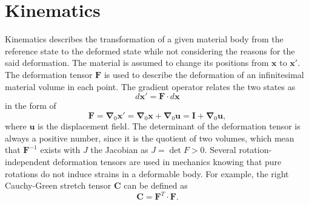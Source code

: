 \appendix
\chapter{Kinematics}\label{app-kine}
Kinematics describes the transformation of a given material body from the reference state to the deformed state while not considering the reasons for the said deformation. The material is assumed to change its positions from $ \textbf{x} $ to $ \textbf{x}' $. The deformation tensor $ \textbf{F} $ is used to describe the deformation of an infinitesimal material volume in each point. The gradient operator relates the two states as
\begin{equation}\label{app-kine-1-1}
d\textbf{x}'=\textbf{F}\cdot d\textbf{x}
\end{equation}
in the form of 
\begin{equation}\label{app-kine-1-2}
\textbf{F}=\bm\nabla_0\textbf{x}'=\bm\nabla_0\textbf{x}+\bm\nabla_0\textbf{u}=\textbf{I}+\bm\nabla_0\textbf{u},
\end{equation}
where $ \textbf{u} $ is the displacement field. The determinant of the deformation tensor is always a positive number, since it is the quotient of two volumes, which mean that $ \textbf{F}^{-1} $ exists with $ J $ the Jacobian as $ J=\det F>0 $. Several rotation-independent deformation tensors are used in mechanics knowing that pure rotations do not induce strains in a deformable body. For example, the right Cauchy-Green stretch tensor $ \textbf{C} $ can be defined as
\begin{equation}\label{app-kine-6}
\textbf{C}=\textbf{F}^T\cdot\textbf{F}.
\end{equation}
